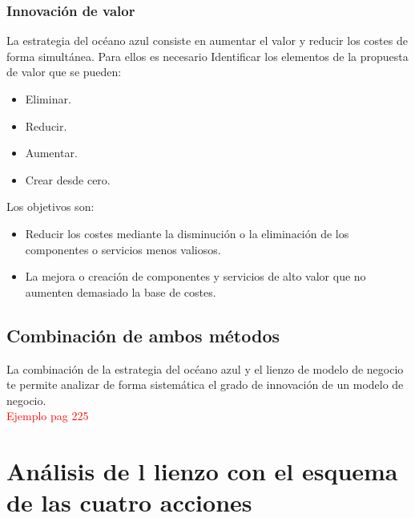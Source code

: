 \documentclass[11pt]{book}
\begin{document}
\subsubsection{Innovación de valor}
La estrategia del océano azul consiste en aumentar el valor y reducir los costes de forma simultánea. 
Para ellos es necesario Identificar los elementos de la propuesta de valor que se pueden:
\begin{itemize}
\item Eliminar.
\item Reducir.
\item Aumentar.
\item Crear desde cero.
\end{itemize} 
Los objetivos son:
\begin{itemize}
\item Reducir los costes mediante la disminución o la eliminación de los componentes o servicios menos valiosos.
\item La mejora o creación de componentes y servicios de alto valor que no aumenten demasiado la base de costes.
\end{itemize}
\subsection{Combinación de ambos métodos}
La combinación de la estrategia del océano azul y el lienzo de modelo de negocio te permite analizar de forma sistemática el grado de innovación de un modelo de negocio.\\
\textcolor{red}{Ejemplo pag 225}
\section{Análisis de l lienzo con el esquema de las cuatro acciones}
\end{document}
